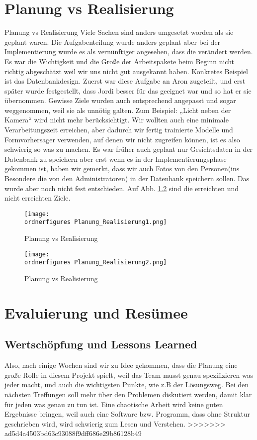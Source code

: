 \chapter{Planung vs Realisierung}
Planung vs Realisierung 
Viele Sachen sind anders umgesetzt worden als sie geplant waren. Die Aufgabenteilung wurde anders geplant aber bei der Implementierung wurde es als vernünftiger angesehen, dass die verändert werden. 
Es war die Wichtigkeit und die Große der Arbeitspakete beim Beginn nicht richtig abgeschätzt weil wir uns nicht gut ausgekannt haben.
Konkretes Beispiel ist das Datenbankdesign. Zuerst war diese Aufgabe an Aron zugeteilt, und erst später wurde festgestellt, dass Jordi besser für das geeignet war und so hat er sie übernommen. 
Gewisse Ziele wurden auch entsprechend angepasst und sogar weggenommen, weil sie als unnötig galten.  Zum Beispiel: „Licht neben der Kamera“ wird nicht mehr berücksichtigt.
Wir wollten auch eine minimale Verarbeitungszeit erreichen, aber dadurch wir fertig trainierte Modelle und Formvorhersager verwenden, auf denen wir nicht zugreifen können, ist es also schwierig so was zu machen. 
Es war früher auch geplant nur Gesichtsdaten in der Datenbank zu speichern aber erst wenn es in der Implementierungsphase gekommen ist, haben wir gemerkt, dass wir auch Fotos von den Personen(ins Besondere die von den Administratoren) in der Datenbank speichern sollen. Das wurde aber noch nicht fest entschieden. Auf Abb. \ref{fig:Planung_Realisierung} sind die erreichten und nicht erreichten Ziele.
\begin{figure}[H]
	\texttt{[image: \\ordnerfigures Planung\_Realisierung1.png]}
	\caption{Planung vs Realisierung}
	\label{fig:Planung_Realisierung}
\end{figure}
\begin{figure}[H]
	\texttt{[image: \\ordnerfigures Planung\_Realisierung2.png]}
	\caption{Planung vs Realisierung}
	\label{fig:Planung_Realisierung}
\end{figure}
\chapter{Evaluierung und Resümee}
\section{Wertschöpfung und Lessons Learned}
Also, nach einige Wochen sind wir zu Idee gekommen, dass die Planung eine große Rolle in diesem Projekt spielt, weil das Team musst genau spezifizieren was jeder macht, und auch die wichtigsten Punkte, wie z.B der Lösungsweg. Bei den nächsten Treffungen soll mehr über den Problemen diskutiert werden, damit klar für jeden was genau zu tun ist. Eine chaotische Arbeit wird keine guten Ergebnisse bringen, weil auch eine Software bzw. Programm, dass ohne Struktur geschrieben wird, wird schwierig zum Lesen und Verstehen.
>>>>>>> ad5d4a4503bd63c93088f9dff686e29b86128b49
